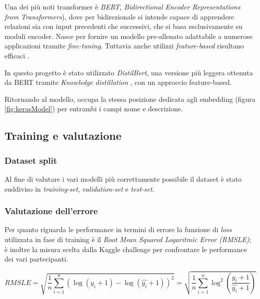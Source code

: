 

Una dei più noti transformer è \textit{BERT}, \textit{Bidirectional Encoder
Representations from Transformers}), dove per bidirezionale si intende capace di
apprendere relazioni sia con input precedenti che successivi, che si basa
esclusivamente su moduli encoder. Nasce per fornire un modello pre-allenato
adattabile a numerose applicazioni tramite \textit{fine-tuning}.
Tuttavia anche utilizzi \textit{feature-based} risultano efficaci
\cite{devlin2018bert}.

In questo progetto è stato utilizzato \textit{DistilBert}, una versione più leggera ottenuta
da BERT tramite \textit{Knowledge distillation} \cite{sanh2020distilbert}, con un approccio feature-based.

Ritornando al modello, occupa la stessa posizione dedicata agli embedding
(figura \ref{fig:kerasModel}) per entrambi i campi nome e descrizione.

\subsection{Training e valutazione}

\subsubsection{Dataset split}

Al fine di valutare i vari modelli più correttamente possibile il dataset è
stato suddiviso in \textit{training-set}, \textit{validation-set} e
\textit{test-set}.

\subsubsection{Valutazione dell'errore}

Per quanto riguarda le performance in termini di errore la funzione di
\textit{loss} utilizzata in fase di training è il \textit{Root Mean Squared
	Logaritmic Error (RMSLE)}; è inoltre la misura scelta dalla Kaggle challenge
per confrontare le performance dei vari partecipanti.

\begin{equation}
	RMSLE
	=
	\sqrt{
	\frac{1}{n}
	\sum_{i=1}^{n}
	( \log(y_i+1) - \log(\hat{y_i}+1) )^2
	}
	=
	\sqrt{
		\frac{1}{n}
		\sum_{i=1}^{n}
		\log^2(\frac{y_i+1}{\hat{y_i}+1})
	}
\end{equation}


